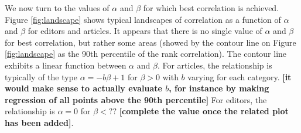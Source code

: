 We now turn to the values of $\alpha$ and $\beta$ for which best correlation is achieved.  Figure \ref{fig:landscape} shows typical landscapes of correlation as a function of $\alpha$ and $\beta$ for editors and articles. It appears that there is no single value of $\alpha$ and $\beta$ for best correlation, but rather some areas (showed by the contour line on Figure \ref{fig:landscape} as the 90th percentile of the rank correlation). The contour line exhibits a linear function between $\alpha$ and $\beta$. For articles, the relationship is typically of the type $\alpha = - b \beta + 1$ for $\beta >0$ with $b$ varying for each category. {\bf [it would make sense to actually evaluate $b$, for instance by making regression of all points above the 90th percentile]} For editors, the relationship is $\alpha = 0$ for $\beta < ??$ {\bf [complete the value once the related plot has been added]}. 

